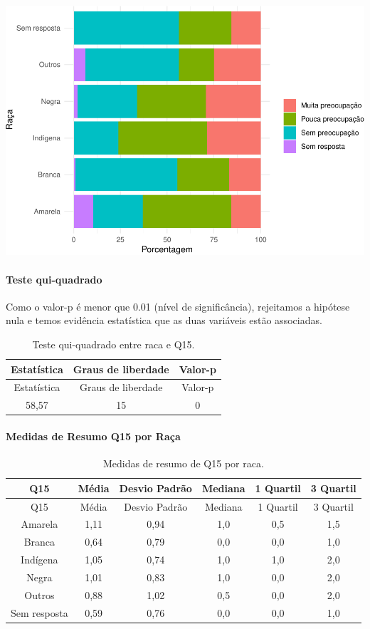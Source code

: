 \documentclass[]{article}
\let\oldparagraph\paragraph
\renewcommand{\paragraph}[1]{\oldparagraph{#1}\mbox{}}
\begin{document}
\begin{center}\includegraphics[width=0.75\linewidth]{relatorio_covid19_files/figure-latex/unnamed-chunk-102-1} \end{center}

\hypertarget{teste-qui-quadrado-10}{%
\paragraph{Teste qui-quadrado}\label{teste-qui-quadrado-10}}

Como o valor-p é menor que 0.01 (nível de significância), rejeitamos a hipótese nula e temos evidência estatística que as duas variáveis estão associadas.

\begin{longtable}[]{@{}ccc@{}}
\caption{\label{tab:unnamed-chunk-104}Teste qui-quadrado entre raca e Q15.}\tabularnewline
\toprule
Estatística & Graus de liberdade & Valor-p\tabularnewline
\midrule
\endfirsthead
\toprule
Estatística & Graus de liberdade & Valor-p\tabularnewline
\midrule
\endhead
58,57 & 15 & 0\tabularnewline
\bottomrule
\end{longtable}

\cleardoublepage

\hypertarget{medidas-de-resumo-q15-por-rauxe7a}{%
\paragraph{Medidas de Resumo Q15 por Raça}\label{medidas-de-resumo-q15-por-rauxe7a}}

\begin{longtable}[]{@{}cccccc@{}}
\caption{\label{tab:unnamed-chunk-105}Medidas de resumo de Q15 por raca.}\tabularnewline
\toprule
Q15 & Média & Desvio Padrão & Mediana & 1 Quartil & 3 Quartil\tabularnewline
\midrule
\endfirsthead
\toprule
Q15 & Média & Desvio Padrão & Mediana & 1 Quartil & 3 Quartil\tabularnewline
\midrule
\endhead
Amarela & 1,11 & 0,94 & 1,0 & 0,5 & 1,5\tabularnewline
Branca & 0,64 & 0,79 & 0,0 & 0,0 & 1,0\tabularnewline
Indígena & 1,05 & 0,74 & 1,0 & 1,0 & 2,0\tabularnewline
Negra & 1,01 & 0,83 & 1,0 & 0,0 & 2,0\tabularnewline
Outros & 0,88 & 1,02 & 0,5 & 0,0 & 2,0\tabularnewline
Sem resposta & 0,59 & 0,76 & 0,0 & 0,0 & 1,0\tabularnewline
\bottomrule
\end{longtable}
\end{document}
